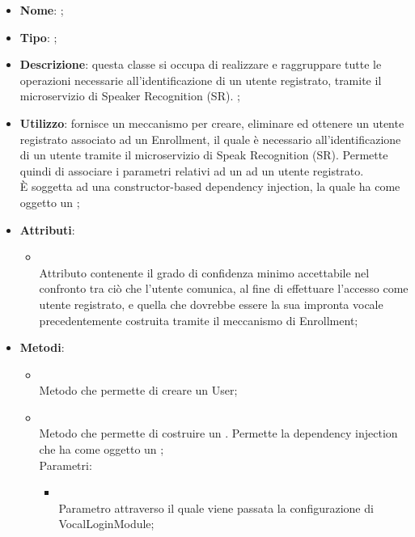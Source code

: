 \begin{itemize}
	\item \textbf{Nome}: ;
	\item \textbf{Tipo}: ;
	\item \textbf{Descrizione}: questa classe si occupa di realizzare e raggruppare tutte le operazioni necessarie all'identificazione di un utente registrato, tramite il microservizio di Speaker Recognition (SR). ;
	\item \textbf{Utilizzo}: fornisce un meccanismo per creare, eliminare ed ottenere un utente registrato associato ad un Enrollment, il quale è necessario all'identificazione di un utente tramite il microservizio di Speak Recognition (SR). Permette quindi di associare i parametri relativi ad un  ad un utente registrato.\\
È soggetta ad una constructor-based dependency injection, la quale ha come oggetto un ;
	\item \textbf{Attributi}:
	\begin{itemize}
		\item[]  \\
		Attributo contenente il grado di confidenza minimo accettabile nel confronto tra ciò che l'utente comunica, al fine di effettuare l'accesso come utente registrato, e quella che dovrebbe essere la sua impronta vocale precedentemente costruita tramite il meccanismo di Enrollment;
	\end{itemize}
	\item \textbf{Metodi}:
	\begin{itemize}
		\item[]  \\
		Metodo che permette di creare un User;\\
		\item[]  \\
		Metodo che permette di costruire un . Permette la dependency injection che ha come oggetto un ;\\
		Parametri:
		\begin{itemize}
			\item {} \\
			Parametro attraverso il quale viene passata la configurazione di VocalLoginModule;
		\end{itemize}

\end{itemize}
\end{itemize}
